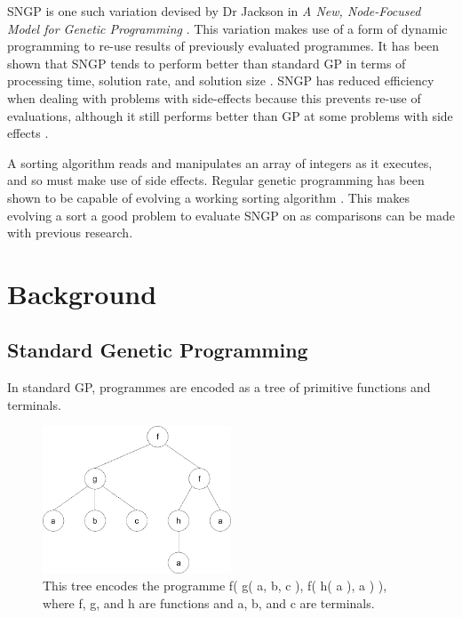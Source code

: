 \documentclass{article}
\begin{document}
		SNGP is one such variation devised by Dr Jackson in \textit{A New, Node-Focused Model for Genetic Programming} \cite{jackson_new_2012}. This variation makes use of a form of dynamic programming to re-use results of previously evaluated programmes. It has been shown that SNGP tends to perform better than standard GP in terms of processing time, solution rate, and solution size \cite{jackson_new_2012}. SNGP has reduced efficiency when dealing with problems with side-effects because this prevents re-use of evaluations, although it still performs better than GP at some problems with side effects \cite{jackson_single_2012}. 
		
		A sorting algorithm reads and manipulates an array of integers as it executes, and so must make use of side effects. Regular genetic programming has been shown to be capable of evolving a working sorting algorithm \cite{kinnear_evolving_1993,kinnear_generality_1993}. This makes evolving a sort a good problem to evaluate SNGP on as comparisons can be made with previous research.
	
	\section{Background}
	
		\subsection{Standard Genetic Programming}
		
			In standard GP, programmes are encoded as a tree of primitive functions and terminals.
			
			\begin{figure}[H]
				\centering
				\includegraphics[width=0.5\textwidth]{1_gp_example_tree}
				\caption{This tree encodes the programme f( g( a, b, c ), f( h( a ), a ) ), where f, g, and h are functions and a, b, and c are terminals.}
			\end{figure}
			
\end{document}
